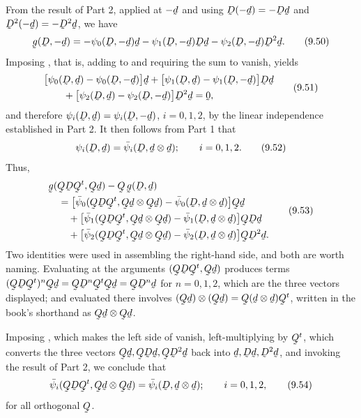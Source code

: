 From the result of Part 2, applied at $-\bd$ and using
$\bD(-\bd)=-\bD\bd$ and $\bD^{2}(-\bd)=-\bD^{2}\bd$, we have
\begin{equation}
   \bg(\bD,-\bd)=-\psi_{0}(\bD,-\bd)\bd-\psi_{1}(\bD,-\bd)\bD\bd
   -\psi_{2}(\bD,-\bd)\bD^{2}\bd .
   \tag{9.50}\label{eq:9.50}
\end{equation}
Imposing , that is, adding  to  and
requiring the sum to vanish, yields
\begin{equation}
\begin{aligned}
   &\big[\psi_{0}(\bD,\bd)-\psi_{0}(\bD,-\bd)\big]\bd
   +\big[\psi_{1}(\bD,\bd)-\psi_{1}(\bD,-\bd)\big]\bD\bd\\
   &\qquad+\big[\psi_{2}(\bD,\bd)-\psi_{2}(\bD,-\bd)\big]\bD^{2}\bd
   =\bze,
\end{aligned}
   \tag{9.51}\label{eq:9.51}
\end{equation}
and therefore $\psi_{i}(\bD,\bd)=\psi_{i}(\bD,-\bd)$, $i=0,1,2$, by the
linear independence established in Part 2. It then follows from Part 1
that
\begin{equation}
   \psi_{i}(\bD,\bd)=\bar\psi_{i}(\bD,\bd\otimes\bd);
   \qquad i=0,1,2 .
   \tag{9.52}\label{eq:9.52}
\end{equation}
Thus,
\begin{equation}
\begin{aligned}
   &\bg(\bQ\bD\bQ^{t},\bQ\bd)-\bQ\,\bg(\bD,\bd)\\
   &\quad=\big[\bar\psi_{0}(\bQ\bD\bQ^{t},\bQ\bd\otimes\bQ\bd)
     -\bar\psi_{0}(\bD,\bd\otimes\bd)\big]\bQ\bd\\
   &\qquad+\big[\bar\psi_{1}(\bQ\bD\bQ^{t},\bQ\bd\otimes\bQ\bd)
     -\bar\psi_{1}(\bD,\bd\otimes\bd)\big]\bQ\bD\bd\\
   &\qquad+\big[\bar\psi_{2}(\bQ\bD\bQ^{t},\bQ\bd\otimes\bQ\bd)
     -\bar\psi_{2}(\bD,\bd\otimes\bd)\big]\bQ\bD^{2}\bd .
\end{aligned}
   \tag{9.53}\label{eq:9.53}
\end{equation}
Two identities were used in assembling the right-hand side, and both are
worth naming. Evaluating  at the arguments
$(\bQ\bD\bQ^{t},\bQ\bd)$ produces terms
$(\bQ\bD\bQ^{t})^{n}\bQ\bd=\bQ\bD^{n}\bQ^{t}\bQ\bd=\bQ\bD^{n}\bd$ for
$n=0,1,2$, which are the three vectors displayed; and 
evaluated there involves
$(\bQ\bd)\otimes(\bQ\bd)=\bQ(\bd\otimes\bd)\bQ^{t}$, written in the
book's shorthand as $\bQ\bd\otimes\bQ\bd$.

Imposing , which makes the left side of  vanish,
left-multiplying by $\bQ^{t}$, which converts the three vectors
$\bQ\bd,\bQ\bD\bd,\bQ\bD^{2}\bd$ back into $\bd,\bD\bd,\bD^{2}\bd$, and
invoking the result of Part 2, we conclude that
\begin{equation}
   \bar\psi_{i}(\bQ\bD\bQ^{t},\bQ\bd\otimes\bQ\bd)
   =\bar\psi_{i}(\bD,\bd\otimes\bd);
   \qquad i=0,1,2,
   \tag{9.54}\label{eq:9.54}
\end{equation}
for all orthogonal $\bQ$.

